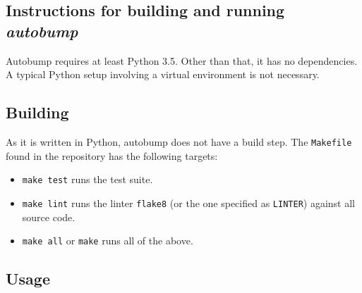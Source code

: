 \documentclass{l4proj}
\begin{document}
\begin{appendices}

\chapter{Instructions for building and running \textit{autobump}}

Autobump requires at least Python 3.5. Other than that, it has no
dependencies. A typical Python setup involving a virtual environment
is not necessary.

\section{Building}

As it is written in Python, autobump does not have a build step. The
\texttt{Makefile} found in the repository has the following targets:

\begin{itemize}
\item \texttt{make test} runs the test suite.
\item \texttt{make lint} runs the linter \texttt{flake8} (or the one
specified as \texttt{LINTER}) against all source code.
\item \texttt{make all} or \texttt{make} runs all of the above.
\end{itemize}

\section{Usage}

\end{appendices}



\end{document}
